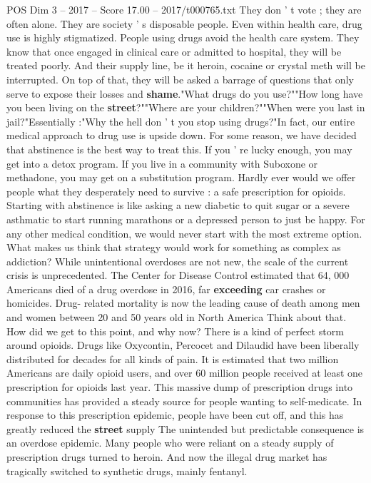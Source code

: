 \begin{textsample}{POS Dim 3 – 2017 – Score 17.00 – 2017/t000765.txt}
They don ' t vote ; they are often alone.
They are society ' s disposable people.
Even within health care, drug use is highly stigmatized.
People using drugs avoid the health care system.
They know that once engaged in clinical care or admitted to hospital, they will be treated poorly.
And their supply line, be it heroin, cocaine or crystal meth will be interrupted.
On top of that, they will be asked a barrage of questions that only serve to expose their losses and \textbf{shame}."What drugs do you use?""How long have you been living on the \textbf{street}?""Where are your children?""When were you last in jail?"Essentially :"Why the hell don ' t you stop using drugs?"In fact, our entire medical approach to drug use is upside down.
For some reason, we have decided that abstinence is the best way to treat this.
If you ' re lucky enough, you may get into a detox program.
If you live in a community with Suboxone or methadone, you may get on a substitution program.
Hardly ever would we offer people what they desperately need to survive : a safe prescription for opioids.
Starting with abstinence is like asking a new diabetic to quit sugar or a severe asthmatic to start running marathons or a depressed person to just be happy.
For any other medical condition, we would never start with the most extreme option.
What makes us think that strategy would work for something as complex as addiction?
While unintentional overdoses are not new, the scale of the current crisis is unprecedented.
The Center for Disease Control estimated that 64, 000 Americans died of a drug overdose in 2016, far \textbf{exceeding} car crashes or homicides.
Drug- related mortality is now the leading cause of death among men and women between 20 and 50 years old in North America Think about that.
How did we get to this point, and why now?
There is a kind of perfect storm around opioids.
Drugs like Oxycontin, Percocet and Dilaudid have been liberally distributed for decades for all kinds of pain.
It is estimated that two million Americans are daily opioid users, and over 60 million people received at least one prescription for opioids last year.
This massive dump of prescription drugs into communities has provided a steady source for people wanting to self-medicate.
In response to this prescription epidemic, people have been cut off, and this has greatly reduced the \textbf{street} supply The unintended but predictable consequence is an overdose epidemic.
Many people who were reliant on a steady supply of prescription drugs turned to heroin.
And now the illegal drug market has tragically switched to synthetic drugs, mainly fentanyl.

\end{textsample}
